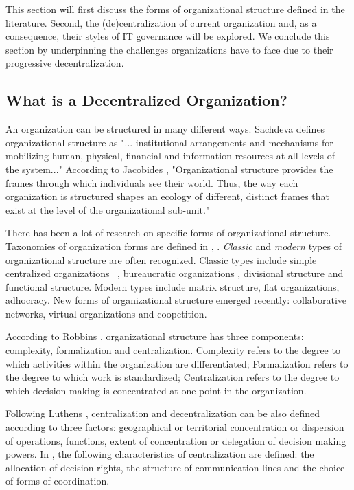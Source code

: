 This section will first discuss the forms of organizational structure defined in the literature. Second, the (de)centralization of current organization and, as a consequence, their styles of IT governance will be explored. We conclude this section by underpinning the challenges organizations have to face due to their progressive decentralization.

\subsection{What is a Decentralized Organization?} 
 
An organization can be structured in many different ways. Sachdeva \cite{sachdeva1990} defines organizational structure as "... institutional arrangements and mechanisms for mobilizing human, physical, financial and information resources at all levels of the system..." According to Jacobides \cite{jacobides2007}, "Organizational structure provides the frames through which individuals see their world. Thus, the way each organization is structured shapes an ecology of different, distinct frames that exist at the level of the organizational sub-unit." 

There has been a lot of research on specific forms of organizational structure. Taxonomies of organization forms are defined in  \cite{mckelvey1982}, \cite{rich1992}.   \textit{Classic} and \textit{modern} types of organizational structure are often recognized.  Classic types include simple centralized organizations ~\cite{Mintzberg1979}, bureaucratic organizations \cite{mintzberg1981}, divisional structure and functional structure. Modern  types include matrix structure, flat organizations, adhocracy. New forms of organizational structure emerged recently: collaborative networks, virtual organizations and coopetition.

According to Robbins \cite{robbins1997}, organizational structure has three components: complexity, formalization and centralization.  Complexity refers to the degree to which activities within the organization are differentiated; Formalization refers to the degree to which work is standardized; Centralization refers to the degree to which decision making is concentrated at one point in the organization. 

Following Luthens \cite{luthans2006}, centralization and decentralization can be also defined according to three factors:  geographical or territorial concentration or dispersion of operations, functions,  extent of concentration or delegation of decision making powers. In \cite{pearlson2009},  the following characteristics of centralization are defined: the allocation of decision rights,  the structure of communication lines and  the choice of forms of coordination.

